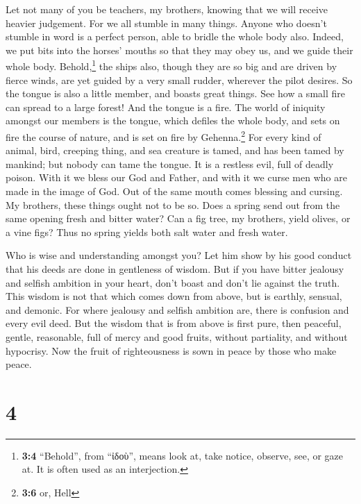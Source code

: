  Let not many of you be teachers, my brothers, knowing
that we will receive heavier judgement.  For we all
stumble in many things. Anyone who doesn't stumble in word is a perfect
person, able to bridle the whole body also.  Indeed, we
put bits into the horses' mouths so that they may obey us, and we guide
their whole body.  Behold,\footnote{\textbf{3:4}
  ``Behold'', from ``ἰδοὺ'', means look at, take notice, observe, see,
  or gaze at. It is often used as an interjection.} the ships also,
though they are so big and are driven by fierce winds, are yet guided by
a very small rudder, wherever the pilot desires.  So the
tongue is also a little member, and boasts great things. See how a small
fire can spread to a large forest!  And the tongue is a
fire. The world of iniquity amongst our members is the tongue, which
defiles the whole body, and sets on fire the course of nature, and is
set on fire by Gehenna.\footnote{\textbf{3:6} or, Hell} 
For every kind of animal, bird, creeping thing, and sea creature is
tamed, and has been tamed by mankind;  but nobody can tame
the tongue. It is a restless evil, full of deadly poison. 
With it we bless our God and Father, and with it we curse men who are
made in the image of God.  Out of the same mouth comes
blessing and cursing. My brothers, these things ought not to be so.
 Does a spring send out from the same opening fresh and
bitter water?  Can a fig tree, my brothers, yield olives,
or a vine figs? Thus no spring yields both salt water and fresh water.

 Who is wise and understanding amongst you? Let him show
by his good conduct that his deeds are done in gentleness of wisdom.
 But if you have bitter jealousy and selfish ambition in
your heart, don't boast and don't lie against the truth. 
This wisdom is not that which comes down from above, but is earthly,
sensual, and demonic.  For where jealousy and selfish
ambition are, there is confusion and every evil deed. 
But the wisdom that is from above is first pure, then peaceful, gentle,
reasonable, full of mercy and good fruits, without partiality, and
without hypocrisy.  Now the fruit of righteousness is
sown in peace by those who make peace.

\hypertarget{section-3}{%
\section{4}\label{section-3}}

